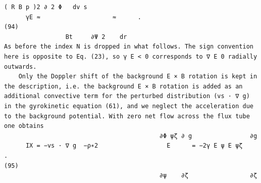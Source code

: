 \documentclass[a4paper]{article}
\newcommand{\gkwpagefont}{\fontsize{6.0pt}{7.55pt}\selectfont}
\begin{document}
\begin{Verbatim}[fontsize=\gkwpagefont]
             ( R B p )2 ∂ 2 Φ   dv s
      γE ≈                    ≈      .                                                                                                       (94)
                 Bt     ∂Ψ 2    dr
As before the index N is dropped in what follows. The sign convention here is opposite to Eq. (23), so γ E < 0 corresponds to ∇ E 0 radially
outwards.
    Only the Doppler shift of the background E × B rotation is kept in the description, i.e. the background E × B rotation is added as an
additional convective term for the perturbed distribution (vs · ∇ g) in the gyrokinetic equation (61), and we neglect the acceleration due
to the background potential. With zero net flow across the flux tube one obtains
                                           ∂Φ ψζ ∂ g                ∂g
      IX = −vs · ∇ g  −ρ∗2                   E      = −2γ E ψ E ψζ    .                                                                     (95)
                                           ∂ψ    ∂ζ                 ∂ζ
\end{Verbatim}
\newpage
\end{document}

